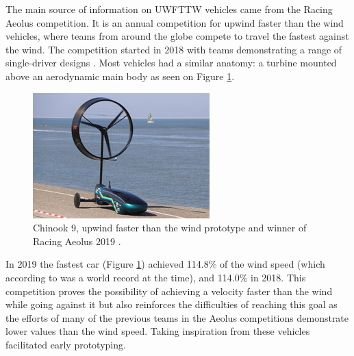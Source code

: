 The main source of information on UWFTTW vehicles came from the Racing Aeolus competition. It is an annual competition for upwind faster than the wind vehicles, where teams from around the globe compete to travel the fastest against the wind. The competition started in 2018 with teams demonstrating a range of single-driver designs \cite{raeolus}. Most vehicles had a similar anatomy: a turbine mounted above an aerodynamic main body as seen on Figure \ref{fig:chinook}.

\begin{figure}[h]
    \centering
    \includegraphics[width=0.6\linewidth]{images/part1/exisitingVeh2.png}
    \caption{Chinook 9, upwind faster than the wind prototype and winner of Racing Aeolus 2019 \cite{raeolus}.}
    \label{fig:chinook}
\end{figure}

In 2019 the fastest car (Figure \ref{fig:chinook}) achieved 114.8\% of the wind speed (which according to \cite{raeolus} was a world record at the time), and 114.0\% in 2018. This competition proves the possibility of achieving a velocity faster than the wind while going against it but also reinforces the difficulties of reaching this goal as the efforts of many of the previous teams in the Aeolus competitions demonstrate lower values than the wind speed. Taking inspiration from these vehicles facilitated early prototyping. 


